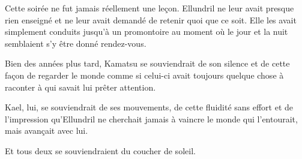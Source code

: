 Cette soirée ne fut jamais réellement une leçon. Ellundril ne leur avait
presque rien enseigné et ne leur avait demandé de retenir quoi que ce soit.
Elle les avait simplement conduits jusqu'à un promontoire au moment où le jour
et la nuit semblaient s'y être donné rendez-vous.

Bien des années plus tard, Kamatsu se souviendrait de son silence et de cette
façon de regarder le monde comme si celui-ci avait toujours quelque chose à
raconter à qui savait lui prêter attention.

Kael, lui, se souviendrait de ses mouvements, de cette fluidité sans effort et
de l'impression qu'Ellundril ne cherchait jamais à vaincre le monde qui
l'entourait, mais avançait avec lui.

Et tous deux se souviendraient du coucher de soleil.
